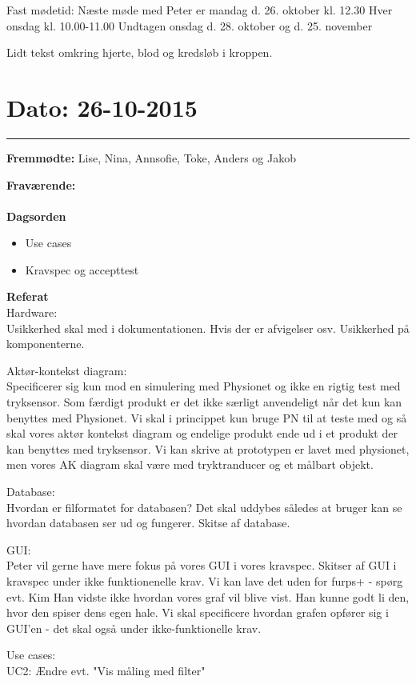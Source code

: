 Fast mødetid:
Næste møde med Peter er mandag d. 26. oktober kl. 12.30
Hver onsdag kl. 10.00-11.00
Undtagen onsdag d. 28. oktober og d. 25. november


Lidt tekst omkring hjerte, blod og kredsløb i kroppen.


\section{Dato: 26-10-2015}
\hrule

\textbf{Fremmødte:} Lise, Nina, Annsofie, Toke, Anders og Jakob

\textbf{Fraværende:} 
\\
\\
\textbf{Dagsorden}
\begin{itemize}
	\item Use cases
	\item Kravspec og accepttest
\end{itemize}

\textbf{Referat}
\\
Hardware:
\\
Usikkerhed skal med i dokumentationen. Hvis der er afvigelser osv. Usikkerhed på komponenterne.

Aktør-kontekst diagram:
\\
Specificerer sig kun mod en simulering med Physionet og ikke en rigtig test med tryksensor. 
Som færdigt produkt er det ikke særligt anvendeligt når det kun kan benyttes med Physionet. Vi skal i princippet kun bruge PN til at teste med og så skal vores aktør kontekst diagram og endelige produkt ende ud i et produkt der kan benyttes med tryksensor. 
Vi kan skrive at prototypen er lavet med physionet, men vores AK diagram skal være med tryktranducer og et målbart objekt.


Database:
\\
Hvordan er filformatet for databasen? Det skal uddybes således at bruger kan se hvordan databasen ser ud og fungerer.
Skitse af database.

GUI:
\\
Peter vil gerne have mere fokus på vores GUI i vores kravspec.
Skitser af GUI i kravspec under ikke funktionenelle krav.
Vi kan lave det uden for furps+ - spørg evt. Kim
Han vidste ikke hvordan vores graf vil blive vist. 
Han kunne godt li den, hvor den spiser dens egen hale.
Vi skal specificere hvordan grafen opfører sig i GUI'en - det skal også under ikke-funktionelle krav.


Use cases:
\\
UC2: Ændre evt. "Vis måling med filter"

